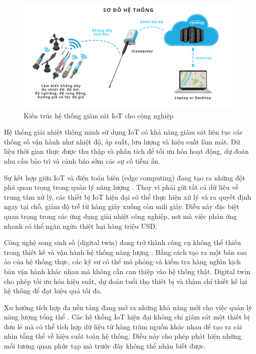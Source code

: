 \documentclass[../main.tex]{subfiles}
\begin{document}
\begin{figure}
    \centering
    \includegraphics[width=1\textwidth]{Hinhve/iot_monitoring_system.jpg}
    \caption{Kiến trúc hệ thống giám sát IoT cho công nghiệp}
    \label{fig:iot_monitoring_system}
\end{figure}

Hệ thống giải nhiệt thông minh sử dụng IoT có khả năng giám sát liên tục các thông số vận hành như nhiệt độ, áp suất, lưu lượng và hiệu suất làm mát. Dữ liệu thời gian thực được thu thập và phân tích để tối ưu hóa hoạt động, dự đoán nhu cầu bảo trì và cảnh báo sớm các sự cố tiềm ẩn.

Sự kết hợp giữa IoT và điện toán biên (edge computing) đang tạo ra những đột phá quan trọng trong quản lý năng lượng \cite{kumar2023edge}. Thay vì phải gửi tất cả dữ liệu về trung tâm xử lý, các thiết bị IoT hiện đại có thể thực hiện xử lý và ra quyết định ngay tại chỗ, giảm độ trễ từ hàng giây xuống còn mili giây. Điều này đặc biệt quan trọng trong các ứng dụng giải nhiệt công nghiệp, nơi mà việc phản ứng nhanh có thể ngăn ngừa thiệt hại hàng triệu USD.

Công nghệ song sinh số (digital twin) đang trở thành công cụ không thể thiếu trong thiết kế và vận hành hệ thống năng lượng \cite{zhao2023digital}. Bằng cách tạo ra một bản sao ảo của hệ thống thực, các kỹ sư có thể mô phỏng và kiểm tra hàng nghìn kịch bản vận hành khác nhau mà không cần can thiệp vào hệ thống thật. Digital twin cho phép tối ưu hóa hiệu suất, dự đoán tuổi thọ thiết bị và thậm chí thiết kế lại hệ thống để đạt hiệu quả tối đa.

Xu hướng tích hợp đa nền tảng đang mở ra những khả năng mới cho việc quản lý năng lượng tổng thể \cite{mordor2023iot}. Các hệ thống IoT hiện đại không chỉ giám sát một thiết bị đơn lẻ mà có thể tích hợp dữ liệu từ hàng trăm nguồn khác nhau để tạo ra cái nhìn tổng thể về hiệu suất toàn hệ thống. Điều này cho phép phát hiện những mối tương quan phức tạp mà trước đây không thể nhận biết được.
\end{document}
